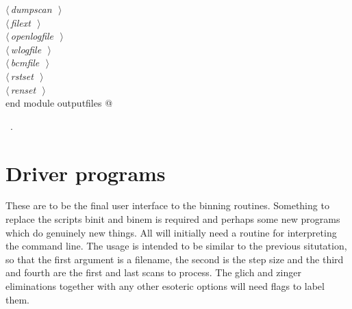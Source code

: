 \documentclass[10pt,a4paper,notitlepage]{article}
\begin{document}
\begin{flushleft}
\begin{minipage}{\linewidth}
\begin{list}{}{}
\mbox{}\verb@@\hbox{$\langle\,${\it dumpscan}\nobreak\ {\footnotesize {}}$\,\rangle$}\verb@@\\
\mbox{}\verb@@\hbox{$\langle\,${\it filext}\nobreak\ {\footnotesize {}}$\,\rangle$}\verb@@\\
\mbox{}\verb@@\hbox{$\langle\,${\it openlogfile}\nobreak\ {\footnotesize {}}$\,\rangle$}\verb@@\\
\mbox{}\verb@@\hbox{$\langle\,${\it wlogfile}\nobreak\ {\footnotesize {}}$\,\rangle$}\verb@@\\
\mbox{}\verb@@\hbox{$\langle\,${\it bcmfile}\nobreak\ {\footnotesize {}}$\,\rangle$}\verb@@\\
\mbox{}\verb@@\hbox{$\langle\,${\it rstset}\nobreak\ {\footnotesize {}}$\,\rangle$}\verb@@\\
\mbox{}\verb@@\hbox{$\langle\,${\it renset}\nobreak\ {\footnotesize {}}$\,\rangle$}\verb@@\\
\mbox{}\verb@      end module outputfiles                                                 @{\NWsep}
\end{list}
\vspace{-1.5ex}
\footnotesize
\begin{list}{}{\setlength{\itemsep}{-\parsep}\setlength{\itemindent}{-\leftmargin}}
\item \NWtxtMacroRefIn\ .

\item{}
\end{list}
\end{minipage}\vspace{4ex}
\end{flushleft}
\section{Driver programs}
These are to be the final user interface to the binning routines. Something to
replace the scripts binit and binem is required and perhaps some new programs
which do genuinely new things. All will initially need a routine
for interpreting the command line. The usage is intended to be similar
to the previous situtation, so that the first argument is a
filename, the second is the step size and the third and fourth are the first
and last scans to process. The glich and zinger eliminations together with any
other esoteric options will need flags to label them.
\end{document}

